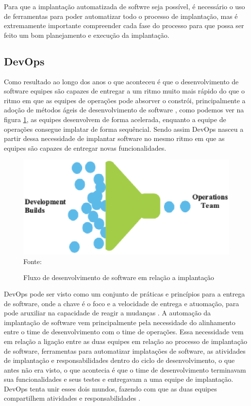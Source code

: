 Para que a implantação automatizada de softwre seja possível, é necessário o uso
de ferramentas para poder automatizar todo o processo de implantação,
mas é extremamente importante compreender cada fase do processo para que possa ser
feito um bom planejamento e execução da implantação.

\subsection{DevOps}
\label{subsec:devops}
Como resultado ao longo dos anos o que aconteceu é que o desenvolvimento de software
equipes são capazes de entregar a um ritmo muito mais rápido do que o ritmo em
que as equipes de operações pode absorver o constrói, principalmente a adoção
de métodos ágeis de desenvolvimento de software \cite{7173368}, como podemos
ver na figura \ref{fig:devops}, as equipes desenvolvem de forma acelerada, enquanto
a equipe de operações consegue implatar de forma sequêncial. Sendo assim DevOps
nasceu a partir dessa necessidade de implantar software no mesmo ritmo em que
as equipes são capazes de entregar novas funcionalidades.

\begin{figure}[h]
  \centering
  \caption{Fluxo de desenvolvimento de software em relação a implantação}
  \includegraphics[width=1.0\textwidth]
      {figuras/devops.eps}
    Fonte: \cite{7173368}
\label{fig:devops}
\end{figure}

DevOps pode ser visto como um conjunto de práticas e princípios para a entrega de software, onde a
chave é o foco e a velocidade de entrega e atuomação, para pode aruxiliar na capacidade
de reagir a mudanças \cite{7173368}. A automação da implantação de software vem
principalmente pela necessidade do alinhamento entre o time de desenvolvimento
com o time de operações. Essa necessidade vem em relação a ligação entre as duas
equipes em relação ao processo de implantação de software, ferramentas para
automatizar implatações de software, as atividades de implantação e responsabilidades
dentro do ciclo de desenvolvimento, o que antes não era visto, o que acontecia é
que o time de desenvolvimento terminavam sua funcionalidades e seus testes e
entregavam a uma equipe de implantação. DevOps tenta unir esses dois mundos,
fazendo com que as duas equipes compartilhem atividades e responsabilidades \cite{6265084}.

